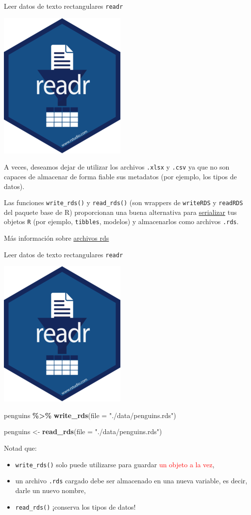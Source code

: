 \documentclass[
  ignorenonframetext,
  aspectratio=169]{beamer}
\newenvironment{Shaded}{\begin{snugshade}}{\end{snugshade}}
\newcommand{\AttributeTok}[1]{\textcolor[rgb]{0.13,0.29,0.53}{#1}}
\newcommand{\FunctionTok}[1]{\textcolor[rgb]{0.13,0.29,0.53}{\textbf{#1}}}
\newcommand{\NormalTok}[1]{#1}
\newcommand{\OtherTok}[1]{\textcolor[rgb]{0.56,0.35,0.01}{#1}}
\newcommand{\SpecialCharTok}[1]{\textcolor[rgb]{0.81,0.36,0.00}{\textbf{#1}}}
\newcommand{\StringTok}[1]{\textcolor[rgb]{0.31,0.60,0.02}{#1}}
\newcommand\red[1]{\textcolor{red}{#1}}
\begin{document}
\begin{frame}[fragile]{Leer datos de texto rectangulares \texttt{readr}}
\label{leer-datos-de-texto-rectangulares-readr-10}
\begin{flushright}\includegraphics[width=0.05\linewidth]{Imgs/logo_readr} \end{flushright}

A veces, deseamos dejar de utilizar los archivos \texttt{.xlsx} y
\texttt{.csv} ya que no son capaces de almacenar de forma fiable sus
metadatos (por ejemplo, los tipos de datos).

Las funciones \texttt{write\_rds()} y \texttt{read\_rds()} (son wrappers
de \texttt{writeRDS} y \texttt{readRDS} del paquete base de R)
proporcionan una buena alternativa para
\href{https://en.wikipedia.org/wiki/Serialization}{serializar} tus
objetos \texttt{R} (por ejemplo, \texttt{tibbles}, modelos) y
almacenarlos como archivos \texttt{.rds}.

Más información sobre
\href{https://mgimond.github.io/ES218/Week02b.html\#Export_to_a_Rds_file}{archivos
rds}
\end{frame}

\begin{frame}[fragile]{Leer datos de texto rectangulares \texttt{readr}}
\label{leer-datos-de-texto-rectangulares-readr-11}
\begin{flushright}\includegraphics[width=0.05\linewidth]{Imgs/logo_readr} \end{flushright}

\begin{Shaded}
\begin{Highlighting}[]
\NormalTok{penguins }\SpecialCharTok{\%\textgreater{}\%} 
  \FunctionTok{write\_rds}\NormalTok{(}\AttributeTok{file =} \StringTok{"./data/penguins.rds"}\NormalTok{)}
\end{Highlighting}
\end{Shaded}

\begin{Shaded}
\begin{Highlighting}[]
\NormalTok{penguins }\OtherTok{\textless{}{-}} \FunctionTok{read\_rds}\NormalTok{(}\AttributeTok{file =} \StringTok{"./data/penguins.rds"}\NormalTok{)}
\end{Highlighting}
\end{Shaded}

Notad que:

\begin{itemize}
\item
  \texttt{write\_rds()} solo puede utilizarse para guardar
  \red{un objeto a la vez},
\item
  un archivo \texttt{.rds} cargado debe ser almacenado en una nueva
  variable, es decir, darle un nuevo nombre,
\item
  \texttt{read\_rds()} ¡conserva los tipos de datos!
\end{itemize}
\end{frame}
\end{document}
